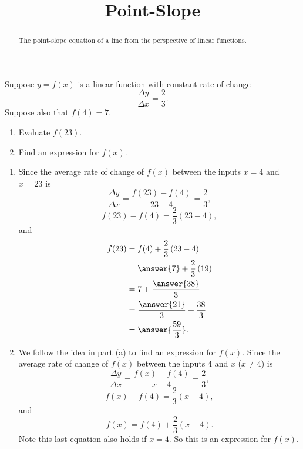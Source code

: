\documentclass{ximera}
\title{Point-Slope}
\begin{document}
\begin{abstract}
The point-slope equation of a line from the perspective of linear functions.
\end{abstract}
\maketitle

\begin{example} \label{Eldfm3fg3}
Suppose $y=f(x)$ is a linear function with constant rate of change
\[
  \frac{\Delta y}{\Delta x} = \frac{2}{3}.
\]
Suppose also that $f(4) = 7$.

\begin{enumerate}
\item Evaluate $f(23)$.

\item Find an expression for $f(x)$.

\end{enumerate}

\begin{explanation}
\begin{enumerate}
\item Since the average rate of change of $f(x)$ between the inputs $x=4$ and $x=23$ is
\[
     \frac{\Delta y}{\Delta x}  = \frac{f(23) - f(4)}{23-4} = \frac{2}{3} ,
\]
\[
        f(23) - f(4) = \frac{2}{3}\left( 23-4 \right),
\]
and
\begin{align*}
       f(23) &= f(4) + \frac{2}{3}\left( 23-4 \right) \\
               &= \answer{7} + \frac{2}{3}\left( 19 \right) \\
               &= 7 + {\frac{\answer{38}}{3}} \\
               & = \frac{\answer{21}}{3} + \frac{38}{3} \\
               & = \answer{\frac{59}{3}} .
\end{align*}

\item We follow the idea in part (a) to find an expression for $f(x)$. 
Since the average rate of change of $f(x)$ between the inputs $4$ and $x$ ($x\neq 4$) is
\[
     \frac{\Delta y}{\Delta x}  = \frac{f(x) - f(4)}{x-4} = \frac{2}{3} ,
\]
\[
        f(x) - f(4) = \frac{2}{3}\left( x-4 \right),
\]
and
\[
  f(x) = f(4) + \frac{2}{3}\left( x-4 \right).
\]
Note this last equation also holds if $x=4$. So this is an expression for $f(x)$.
\end{enumerate}
\end{explanation}
\end{example}
\end{document}
